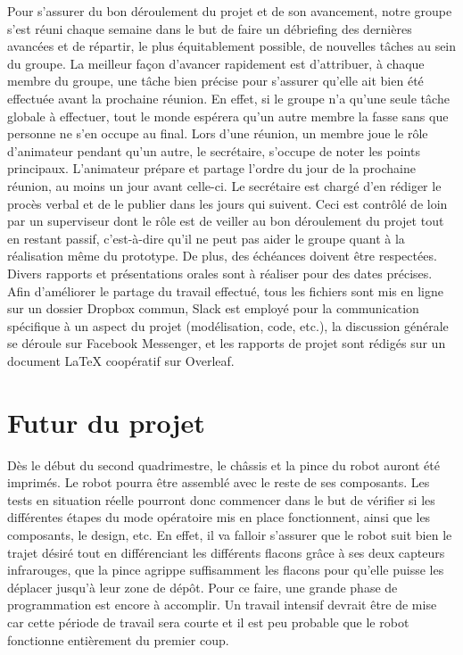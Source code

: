 \documentclass[a4paper,11pt]{article}
\begin{document}
Pour s'assurer du bon déroulement du projet et de son avancement, notre groupe s'est réuni chaque semaine dans le but de faire un débriefing des dernières avancées et de répartir, le plus équitablement possible, de nouvelles tâches au sein du groupe. La meilleur façon d'avancer rapidement est d'attribuer, à chaque membre du groupe, une tâche bien précise pour s'assurer qu'elle ait bien été effectuée avant la prochaine réunion. En effet, si le groupe n'a qu'une seule tâche globale à effectuer, tout le monde espérera qu'un autre membre la fasse sans que personne ne s'en occupe au final. 
Lors d'une réunion, un membre joue le rôle d'animateur pendant qu'un autre, le secrétaire, s'occupe de noter les points principaux. L'animateur prépare et partage l'ordre du jour de la prochaine réunion, au moins un jour avant celle-ci. Le secrétaire est chargé d'en rédiger le procès verbal et de le publier dans les jours qui suivent.
Ceci est contrôlé de loin par un superviseur dont le rôle est de veiller au bon déroulement du projet tout en restant passif, c'est-à-dire qu'il ne peut pas aider le groupe quant à la réalisation même du prototype. De plus, des échéances doivent être respectées. Divers rapports et présentations orales sont à réaliser pour des dates précises. Afin d'améliorer le partage du travail effectué, tous les fichiers sont mis en ligne sur un dossier Dropbox commun, Slack est employé pour la communication spécifique à un aspect du projet (modélisation, code, etc.), la discussion générale se déroule sur Facebook Messenger, et les rapports de projet sont rédigés sur un document LaTeX coopératif sur Overleaf.



\section{Futur du projet}
Dès le début du second quadrimestre, le châssis et la pince du robot auront été imprimés. Le robot pourra être assemblé avec le reste de ses composants.
Les tests en situation réelle pourront donc commencer dans le but de vérifier si les différentes étapes du mode opératoire mis en place fonctionnent, ainsi que les composants, le design, etc. En effet, il va falloir s'assurer que le robot suit bien le trajet désiré tout en différenciant les différents flacons grâce à ses deux capteurs infrarouges, que la pince agrippe suffisamment les flacons pour qu'elle puisse les déplacer jusqu'à leur zone de dépôt. Pour ce faire, une grande phase de programmation est encore à accomplir. Un travail intensif devrait être de mise car cette période de travail sera courte et il est peu probable que le robot fonctionne entièrement du premier coup.
\end{document}
